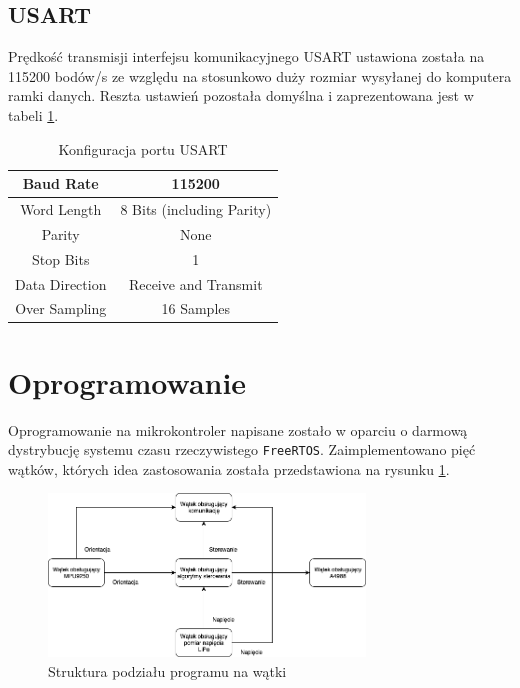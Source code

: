 \subsection{USART}

Prędkość transmisji interfejsu komunikacyjnego USART ustawiona została na 115200 bodów/s ze względu na stosunkowo duży rozmiar wysyłanej do komputera ramki danych. Reszta ustawień pozostała domyślna i zaprezentowana jest w tabeli \ref{Konfiguracja USART}.

\begin{table}[h!]
    \centering
    \caption{Konfiguracja portu USART}
    \begin{tabular}{|c|c|}
        \hline
        Baud Rate & 115200 \\
        \hline
        Word Length & 8 Bits (including Parity) \\
        \hline
        Parity & None \\
        \hline
        Stop Bits & 1 \\
        \hline
        Data Direction & Receive and Transmit \\
        \hline
        Over Sampling & 16 Samples \\
        \hline
    \end{tabular}
    \label{Konfiguracja USART}
\end{table}

\section{Oprogramowanie}

Oprogramowanie na mikrokontroler napisane zostało w oparciu o darmową dystrybucję systemu czasu rzeczywistego \texttt{FreeRTOS}. Zaimplementowano pięć wątków, których idea zastosowania została przedstawiona na rysunku \ref{Watki}. 

\begin{figure}[h!]
    \centering
    \includegraphics[width=0.75\textwidth]{Rysunki/Rozdzial05/Software.png}
    \caption{Struktura podziału programu na wątki}
    \label{Watki}
\end{figure}

